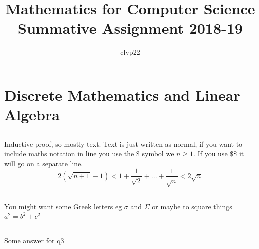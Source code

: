 \documentclass[a4paper, 12pt]{article}
\begin{document}
 
\title{Mathematics for Computer Science Summative Assignment 2018-19} 
\author{clvp22} %

\maketitle 

 
  
 
\section{Discrete Mathematics and Linear Algebra} 
\subsection{} 
Inductive proof, so mostly text. Text is just written as normal, if you want to include maths notation in line you use the $\$$ symbol we $n\geq 1$. 
If you use $\$\$$ it will go on a separate line. $$2(\sqrt{n+1}-1)<1 + \frac{1}{\sqrt{2}} + ... + \frac{1}{\sqrt{n}} < 2\sqrt{n}$$ 
\subsection{} 
You might want some Greek letters eg $\sigma$ and $\Sigma$ or maybe to square things $a^{2} = b^{2} +c^{2}$- 
\subsection{} 
Some answer for q3 
\end{document}

